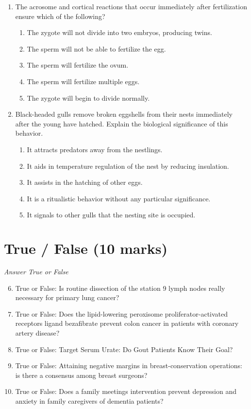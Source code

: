 \documentclass[12pt]{article}
\begin{document}
\begin{enumerate}[label=\arabic*.]
\begin{enumerate}[label=(\alph*)]
    \item The stomach lining secretes digestive enzymes only when food is present
    \item The production of bile in the stomach neutralizes the digestive acids
\end{enumerate}
\item The acrosome and cortical reactions that occur immediately after fertilization ensure which of the following?
\begin{enumerate}[label=(\alph*)]
    \item The zygote will not divide into two embryos, producing twins.
    \item The sperm will not be able to fertilize the egg.
    \item The sperm will fertilize the ovum.
    \item The sperm will fertilize multiple eggs.
    \item The zygote will begin to divide normally.
\end{enumerate}
\item Black-headed gulls remove broken eggshells from their nests immediately after the young have hatched. Explain the biological significance of this behavior.
\begin{enumerate}[label=(\alph*)]
    \item It attracts predators away from the nestlings.
    \item It aids in temperature regulation of the nest by reducing insulation.
    \item It assists in the hatching of other eggs.
    \item It is a ritualistic behavior without any particular significance.
    \item It signals to other gulls that the nesting site is occupied.
\end{enumerate}
\end{enumerate}

\section*{True / False (10 marks)}
\textit{Answer True or False}
\begin{enumerate}[label=\arabic*.]
\setcounter{enumi}{5}
\item True or False: Is routine dissection of the station 9 lymph nodes really necessary for primary lung cancer?
\item True or False: Does the lipid-lowering peroxisome proliferator-activated receptors ligand bezafibrate prevent colon cancer in patients with coronary artery disease?
\item True or False: Target Serum Urate: Do Gout Patients Know Their Goal?
\item True or False: Attaining negative margins in breast-conservation operations: is there a consensus among breast surgeons?
\item True or False: Does a family meetings intervention prevent depression and anxiety in family caregivers of dementia patients?
\end{enumerate}
\end{document}
